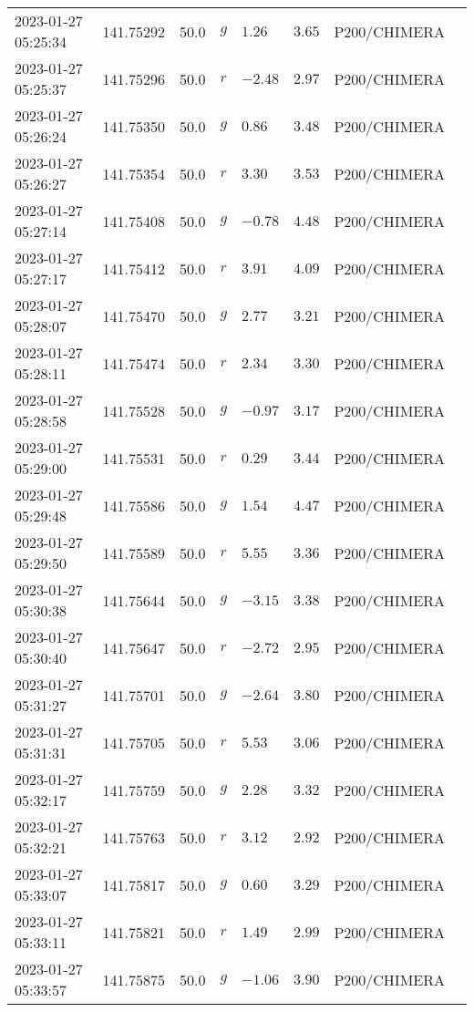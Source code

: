 \documentclass{nature_plusfigure}
\begin{document}
\begin{supplement}
\begin{center}
\begin{longtable}{llllllll}
2023-01-27 05:25:34 & 141.75292 & 50.0 & $g$ & $1.26$ & $3.65$ & P200/CHIMERA &  \\ 
2023-01-27 05:25:37 & 141.75296 & 50.0 & $r$ & $-2.48$ & $2.97$ & P200/CHIMERA &  \\ 
2023-01-27 05:26:24 & 141.75350 & 50.0 & $g$ & $0.86$ & $3.48$ & P200/CHIMERA &  \\ 
2023-01-27 05:26:27 & 141.75354 & 50.0 & $r$ & $3.30$ & $3.53$ & P200/CHIMERA &  \\ 
2023-01-27 05:27:14 & 141.75408 & 50.0 & $g$ & $-0.78$ & $4.48$ & P200/CHIMERA &  \\ 
2023-01-27 05:27:17 & 141.75412 & 50.0 & $r$ & $3.91$ & $4.09$ & P200/CHIMERA &  \\ 
2023-01-27 05:28:07 & 141.75470 & 50.0 & $g$ & $2.77$ & $3.21$ & P200/CHIMERA &  \\ 
2023-01-27 05:28:11 & 141.75474 & 50.0 & $r$ & $2.34$ & $3.30$ & P200/CHIMERA &  \\ 
2023-01-27 05:28:58 & 141.75528 & 50.0 & $g$ & $-0.97$ & $3.17$ & P200/CHIMERA &  \\ 
2023-01-27 05:29:00 & 141.75531 & 50.0 & $r$ & $0.29$ & $3.44$ & P200/CHIMERA &  \\ 
2023-01-27 05:29:48 & 141.75586 & 50.0 & $g$ & $1.54$ & $4.47$ & P200/CHIMERA &  \\ 
2023-01-27 05:29:50 & 141.75589 & 50.0 & $r$ & $5.55$ & $3.36$ & P200/CHIMERA &  \\ 
2023-01-27 05:30:38 & 141.75644 & 50.0 & $g$ & $-3.15$ & $3.38$ & P200/CHIMERA &  \\ 
2023-01-27 05:30:40 & 141.75647 & 50.0 & $r$ & $-2.72$ & $2.95$ & P200/CHIMERA &  \\ 
2023-01-27 05:31:27 & 141.75701 & 50.0 & $g$ & $-2.64$ & $3.80$ & P200/CHIMERA &  \\ 
2023-01-27 05:31:31 & 141.75705 & 50.0 & $r$ & $5.53$ & $3.06$ & P200/CHIMERA &  \\ 
2023-01-27 05:32:17 & 141.75759 & 50.0 & $g$ & $2.28$ & $3.32$ & P200/CHIMERA &  \\ 
2023-01-27 05:32:21 & 141.75763 & 50.0 & $r$ & $3.12$ & $2.92$ & P200/CHIMERA &  \\ 
2023-01-27 05:33:07 & 141.75817 & 50.0 & $g$ & $0.60$ & $3.29$ & P200/CHIMERA &  \\ 
2023-01-27 05:33:11 & 141.75821 & 50.0 & $r$ & $1.49$ & $2.99$ & P200/CHIMERA &  \\ 
2023-01-27 05:33:57 & 141.75875 & 50.0 & $g$ & $-1.06$ & $3.90$ & P200/CHIMERA &  \\ 

\end{longtable}
\end{center}
\end{supplement}
\end{document}
